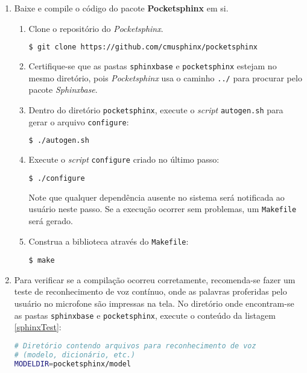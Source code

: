 \begin{enumerate}
\item Baixe e compile o código do pacote \textbf{Pocketsphinx} em si.

\begin{enumerate}
\item Clone o repositório do \textit{Pocketsphinx}.

\begin{lstlisting}[language=Bash]
$ git clone https://github.com/cmusphinx/pocketsphinx
\end{lstlisting}

\item Certifique-se que as pastas \texttt{sphinxbase} e \texttt{pocketsphinx} estejam no mesmo diretório, pois \textit{Pocketsphinx} usa o caminho \texttt{../} para procurar pelo pacote \textit{Sphinxbase}.

\item Dentro do diretório \texttt{pocketsphinx}, execute o \textit{script} \texttt{autogen.sh} para gerar o arquivo \texttt{configure}:

\begin{lstlisting}[language=Bash]
$ ./autogen.sh
\end{lstlisting}

\item Execute o \textit{script} \texttt{configure} criado no último passo:

\begin{lstlisting}[language=Bash]
$ ./configure
\end{lstlisting}

Note que qualquer dependência ausente no sistema será notificada ao usuário neste passo. Se a execução ocorrer sem problemas, um \texttt{Makefile} será gerado.

\item Construa a biblioteca através do \texttt{Makefile}:

\begin{lstlisting}
$ make
\end{lstlisting}
\end{enumerate}

\item Para verificar se a compilação ocorreu corretamente, recomenda-se fazer um teste de reconhecimento de voz contínuo, onde as palavras proferidas pelo usuário no microfone são impressas na tela. No diretório onde encontram-se as pastas \texttt{sphinxbase} e \texttt{pocketsphinx}, execute o conteúdo da listagem \ref{sphinxTest}:

\begin{lstlisting}[language=Bash, caption={Teste de reconhecimento de voz contínuo usando Pocketsphinx}, label={sphinxTest}]
# Diretório contendo arquivos para reconhecimento de voz
# (modelo, dicionário, etc.)
MODELDIR=pocketsphinx/model


\end{lstlisting}
\end{enumerate}
